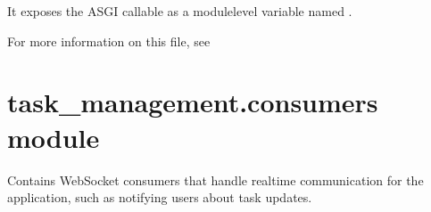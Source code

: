 \documentclass[letterpaper,10pt,english]{sphinxmanual}
\begin{document}
\sphinxAtStartPar
It exposes the ASGI callable as a module\sphinxhyphen{}level variable named .

\sphinxAtStartPar
For more information on this file, see


\section{task\_management.consumers module}
\label{\detokenize{task_management:task-management-consumers-module}}
\sphinxAtStartPar
Contains WebSocket consumers that handle real\sphinxhyphen{}time communication for the application, such as notifying users about task updates.
\label{\detokenize{task_management:module-task_management.consumers}}
\end{document}
